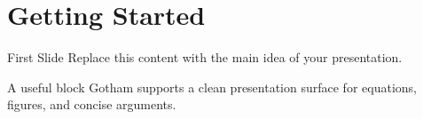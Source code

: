 \documentclass{beamer}
\title{\ToolkitBeamerTitle}
\author{\ToolkitBeamerAuthor}
\institute{\ToolkitBeamerInstitute}
\date{\ToolkitBeamerDate}
\begin{document}
\begin{frame}
  \maketitle
\end{frame}

\section{Getting Started}

\begin{frame}{First Slide}
  Replace this content with the main idea of your presentation.
  \begin{block}{A useful block}
    Gotham supports a clean presentation surface for equations, figures, and concise arguments.
  \end{block}
\end{frame}
\end{document}
